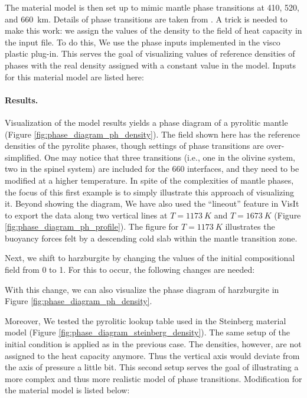 The material model is then set up to mimic mantle phase transitions at 410, 520, and \SI{660}{km}. %
Details of phase transitions are taken from \cite{billen2018decoupling}.
A trick is needed to make this work: we assign the values of the density to the field of heat capacity in the input file. %
To do this, We use the phase inputs implemented in the visco plastic plug-in.
This serves the goal of visualizing values of reference densities of phases with the real density assigned with a constant value in the model.
Inputs for this material model are listed here:



\paragraph{Results.}

Visualization of the model results yields a phase diagram of a pyrolitic mantle (Figure \ref{fig:phase_diagram_ph_density}). %
The field shown here has the reference densities of the pyrolite phases, though settings of phase transitions are over-simplified.
One may notice that three transitions (i.e., one in the olivine system, two in the spinel system) are included for the 660 interfaces, %
and they need to be modified at a higher temperature.
In spite of the complexities of mantle phases, the focus of this first example is to simply illustrate this approach of visualizing it.
Beyond showing the diagram, We have also used the ``lineout'' feature in VisIt to export the data along two vertical lines at $T = \SI{1173}{K}$ and $T = \SI{1673}{K}$ (Figure \ref{fig:phase_diagram_ph_profile}). %
The figure for $T = \SI{1173}{K}$ illustrates the buoyancy forces felt by a descending cold slab within the mantle transition zone.

Next, we shift to harzburgite by changing the values of the initial compositional field from 0 to 1.  %
For this to occur, the following changes are needed:

With this change, we can also visualize the phase diagram of harzburgite in Figure \ref{fig:phase_diagram_ph_density}.

Moreover, We tested the pyrolitic lookup table used in the Steinberg material model (Figure \ref{fig:phase_diagram_steinberg_density}).%
The same setup of the initial condition is applied as in the previous case. %
The densities, however, are not assigned to the heat capacity anymore.
Thus the vertical axis would deviate from the axis of pressure a little bit.
This second setup serves the goal of illustrating a more complex and thus more realistic model of phase transitions.
Modification for the material model is listed below:

